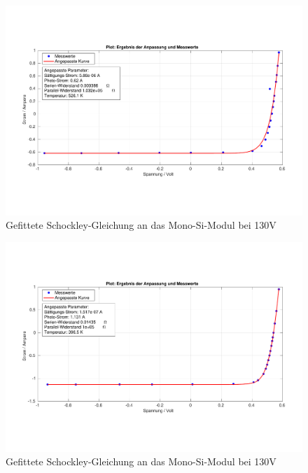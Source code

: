 \begin{figure}[ht]
    \centering
    \includegraphics[width = \linewidth]{Bilder/SiMulti180Plot.pdf}
    \caption{Gefittete Schockley-Gleichung an das Mono-Si-Modul bei 130V}
\end{figure}
\begin{figure}[ht]
    \centering
    \includegraphics[width = \linewidth]{Bilder/SiMulti230Plot.pdf}
    \caption{Gefittete Schockley-Gleichung an das Mono-Si-Modul bei 130V}
\end{figure}
